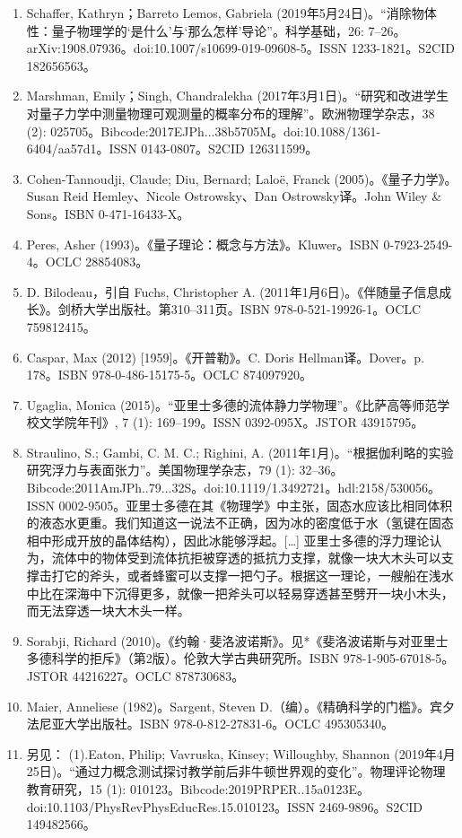 \begin{enumerate}
\item Schaffer, Kathryn；Barreto Lemos, Gabriela (2019年5月24日)。“消除物体性：量子物理学的‘是什么’与‘那么怎样’导论”。科学基础，26: 7–26。arXiv:1908.07936。doi:10.1007/s10699-019-09608-5。ISSN 1233-1821。S2CID 182656563。
\item Marshman, Emily；Singh, Chandralekha (2017年3月1日)。“研究和改进学生对量子力学中测量物理可观测量的概率分布的理解”。欧洲物理学杂志，38 (2): 025705。Bibcode:2017EJPh...38b5705M。doi:10.1088/1361-6404/aa57d1。ISSN 0143-0807。S2CID 126311599。
\item Cohen-Tannoudji, Claude; Diu, Bernard; Laloë, Franck (2005)。《量子力学》。Susan Reid Hemley、Nicole Ostrowsky、Dan Ostrowsky译。John Wiley & Sons。ISBN 0-471-16433-X。
\item Peres, Asher (1993)。《量子理论：概念与方法》。Kluwer。ISBN 0-7923-2549-4。OCLC 28854083。
\item D. Bilodeau，引自 Fuchs, Christopher A. (2011年1月6日)。《伴随量子信息成长》。剑桥大学出版社。第310–311页。ISBN 978-0-521-19926-1。OCLC 759812415。
\item Caspar, Max (2012) [1959]。《开普勒》。C. Doris Hellman译。Dover。p. 178。ISBN 978-0-486-15175-5。OCLC 874097920。
\item Ugaglia, Monica (2015)。“亚里士多德的流体静力学物理”。《比萨高等师范学校文学院年刊》, 7 (1): 169–199。ISSN 0392-095X。JSTOR 43915795。
\item Straulino, S.; Gambi, C. M. C.; Righini, A. (2011年1月)。“根据伽利略的实验研究浮力与表面张力”。美国物理学杂志，79 (1): 32–36。Bibcode:2011AmJPh..79...32S。doi:10.1119/1.3492721。hdl:2158/530056。ISSN 0002-9505。亚里士多德在其《物理学》中主张，固态水应该比相同体积的液态水更重。我们知道这一说法不正确，因为冰的密度低于水（氢键在固态相中形成开放的晶体结构），因此冰能够浮起。[…] 亚里士多德的浮力理论认为，流体中的物体受到流体抗拒被穿透的抵抗力支撑，就像一块大木头可以支撑击打它的斧头，或者蜂蜜可以支撑一把勺子。根据这一理论，一艘船在浅水中比在深海中下沉得更多，就像一把斧头可以轻易穿透甚至劈开一块小木头，而无法穿透一块大木头一样。
\item Sorabji, Richard (2010)。《约翰·斐洛波诺斯》。见*《斐洛波诺斯与对亚里士多德科学的拒斥》（第2版）。伦敦大学古典研究所。ISBN 978-1-905-67018-5。JSTOR 44216227。OCLC 878730683。
\item Maier, Anneliese (1982)。Sargent, Steven D.（编）。《精确科学的门槛》。宾夕法尼亚大学出版社。ISBN 978-0-812-27831-6。OCLC 495305340。
\item 另见：
(1).Eaton, Philip; Vavruska, Kinsey; Willoughby, Shannon (2019年4月25日)。“通过力概念测试探讨教学前后非牛顿世界观的变化”。物理评论物理教育研究，15 (1): 010123。Bibcode:2019PRPER..15a0123E。doi:10.1103/PhysRevPhysEducRes.15.010123。ISSN 2469-9896。S2CID 149482566。\\

\end{enumerate}
